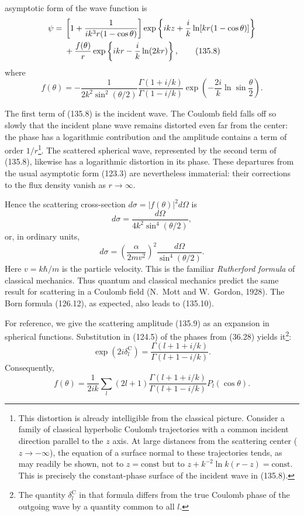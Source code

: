 asymptotic form of the wave function is
\begin{align}
 \psi={}&\left[1+\frac{1}{ik^3r(1-\cos\theta)}\right]
 \exp\left\{ikz+\frac{i}{k}\ln[kr(1-\cos\theta)]\right\}\notag\\
 &+\frac{f(\theta)}{r}\exp\left\{ikr-\frac{i}{k}\ln(2kr)\right\},
 \tag{135.8}
\end{align}
where
\begin{equation}
 f(\theta)=-\frac{1}{2k^2\sin^2(\theta/2)}
 \frac{\Gamma(1+i/k)}{\Gamma(1-i/k)}
 \exp\left(-\frac{2i}{k}\ln\sin\frac{\theta}{2}\right).
 \tag{135.9}
\end{equation}

The first term of (135.8) is the incident wave. The Coulomb field falls off so
slowly that the incident plane wave remains distorted even far from the
center: the phase has a logarithmic contribution and the amplitude contains a
term of order $1/r$\footnote{This distortion is already intelligible from the
classical picture. Consider a family of classical hyperbolic Coulomb
trajectories with a common incident direction parallel to the $z$ axis. At
large distances from the scattering center ($z\to-\infty$), the equation of a
surface normal to these trajectories tends, as may readily be shown, not to
$z=\mathrm{const}$ but to
$z+k^{-2}\ln k(r-z)=\mathrm{const}$. This is precisely the constant-phase
surface of the incident wave in (135.8).}. The scattered spherical wave,
represented by the second term of (135.8), likewise has a logarithmic
distortion in its phase. These departures from the usual asymptotic form
(123.3) are nevertheless immaterial: their corrections to the flux density
vanish as $r\to\infty$.

Hence the scattering cross-section $d\sigma=|f(\theta)|^2d\Omega$ is
\[
 d\sigma=\frac{d\Omega}{4k^2\sin^4(\theta/2)},
\]
or, in ordinary units,
\begin{equation}
 d\sigma=\left(\frac{\alpha}{2mv^2}\right)^2
 \frac{d\Omega}{\sin^4(\theta/2)}.
 \tag{135.10}
\end{equation}
Here $v=k\hbar/m$ is the particle velocity. This is the familiar
\emph{Rutherford formula} of classical mechanics. Thus quantum and classical
mechanics predict the same result for scattering in a Coulomb field
(N.~Mott and W.~Gordon, 1928). The Born formula (126.12), as expected, also
leads to (135.10).

For reference, we give the scattering amplitude (135.9) as an expansion in
spherical functions. Substitution in (124.5) of the phases from
(36.28) yields it\footnote{The quantity $\delta_l^{\mathrm C}$ in that formula
differs from the true Coulomb phase of the outgoing wave by a quantity common
to all $l$.}:
\begin{equation}
 \exp(2i\delta_l^{\mathrm C})=
 \frac{\Gamma(l+1+i/k)}{\Gamma(l+1-i/k)}.
 \tag{135.11}
\end{equation}
Consequently,
\begin{equation}
 f(\theta)=\frac{1}{2ik}\sum_l(2l+1)
 \frac{\Gamma(l+1+i/k)}{\Gamma(l+1-i/k)}P_l(\cos\theta).
 \tag{135.12}
\end{equation}

